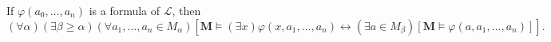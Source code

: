 If $\varphi(a_0, \ldots, a_n)$ is a formula of $\mathcal{L}$, then
$$(\forall \alpha)(\exists \beta \geq \alpha)(\forall a_1, \ldots, a_n \in M_\alpha)[\mathbf{M} \models (\exists x)\varphi(x, a_1, \ldots, a_n) \leftrightarrow (\exists a \in M_\beta)[\mathbf{M} \models \varphi(a, a_1, \ldots, a_n)]].$$
